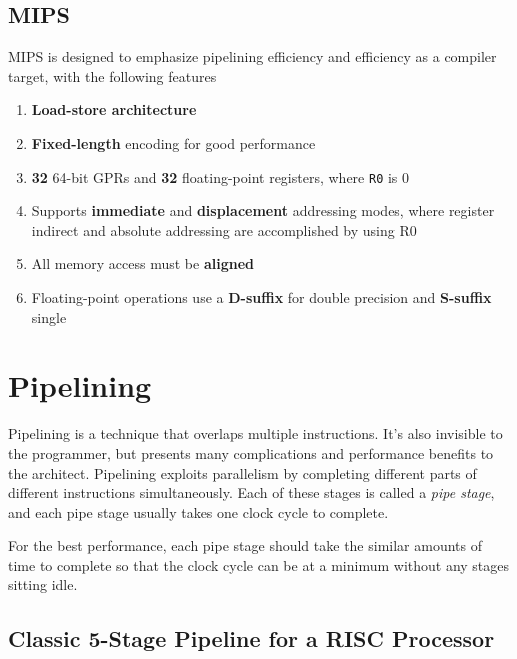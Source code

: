 \documentclass{article}
\begin{document}
\subsection{MIPS}

MIPS is designed to emphasize pipelining efficiency and efficiency as a compiler target, with the following features

\begin{enumerate}
\item \textbf{Load-store architecture}

\item \textbf{Fixed-length} encoding for good performance

\item \textbf{32} 64-bit GPRs and \textbf{32} floating-point registers, where \texttt{R0} is 0

\item Supports \textbf{immediate} and \textbf{displacement} addressing modes, where register indirect and absolute addressing are accomplished by using R0 

\item All memory access must be \textbf{aligned}

\item Floating-point operations use a \textbf{D-suffix} for double precision and \textbf{S-suffix} single

\end{enumerate}


\section{Pipelining}

Pipelining is a technique that overlaps multiple instructions. It's also invisible to the programmer, but presents many complications and performance benefits to the architect. Pipelining exploits parallelism by completing different parts of different instructions simultaneously. Each of these stages is called a \textit{pipe stage}, and each pipe stage usually takes one clock cycle to complete. 

For the best performance, each pipe stage should take the similar amounts of time to complete so that the clock cycle can be at a minimum without any stages sitting idle. 

\subsection{Classic 5-Stage Pipeline for a RISC Processor}
\end{document}
